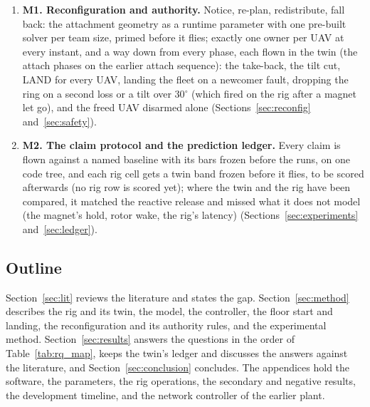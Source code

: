 \begin{enumerate}
    the magnet tip moving with the plate on a taut tether, switches the radio to its own tracker on the same tick,
    folds the newcomer in from a small starting tension, and takes it back and lands it if nothing is proven
    (Section~\ref{sec:admission}). [Twin claim table: the join code tree, after the 21--22 October rig day. Rig:
    eight attach flights on 14--15 October gave one contact and no fold-in; the attach on 21--22 October.]
    (Section~\ref{sec:res_join}).
    \item \textbf{M1. Reconfiguration and authority.} Notice, re-plan, redistribute, fall back: the attachment
    geometry as a runtime parameter with one pre-built solver per team size, primed before it flies; exactly
    one owner per UAV at every instant, and a way down from every phase, each flown in the twin (the attach
    phases on the earlier attach sequence): the take-back, the tilt cut,
    LAND for every UAV, landing the fleet on a newcomer fault, dropping the ring on a second loss or a tilt
    over 30$^\circ$ (which fired on the rig after a magnet let go), and the freed UAV disarmed alone
    (Sections~\ref{sec:reconfig} and~\ref{sec:safety}).
    \item \textbf{M2. The claim protocol and the prediction ledger.} Every claim is flown against a named
    baseline with its bars frozen before the runs, on one code tree, and each rig cell gets a twin band frozen
    before it flies, to be scored afterwards (no rig row is scored yet); where the twin and the rig have been
    compared, it matched the reactive release and missed what it does not model (the magnet's hold, rotor wake,
    the rig's latency)
    (Sections~\ref{sec:experiments} and~\ref{sec:ledger}).
\end{enumerate}

\subsection{Outline}

Section~\ref{sec:lit} reviews the literature and states the gap. Section~\ref{sec:method} describes the
rig and its twin, the model, the controller, the floor start and landing, the reconfiguration and its authority
rules, and the experimental method. Section~\ref{sec:results} answers the questions in the order of
Table~\ref{tab:rq_map}, keeps the twin's ledger and discusses the answers against the literature, and
Section~\ref{sec:conclusion} concludes. The appendices hold the software, the parameters, the rig operations,
the secondary and negative results, the development timeline, and the network controller of the earlier plant.
